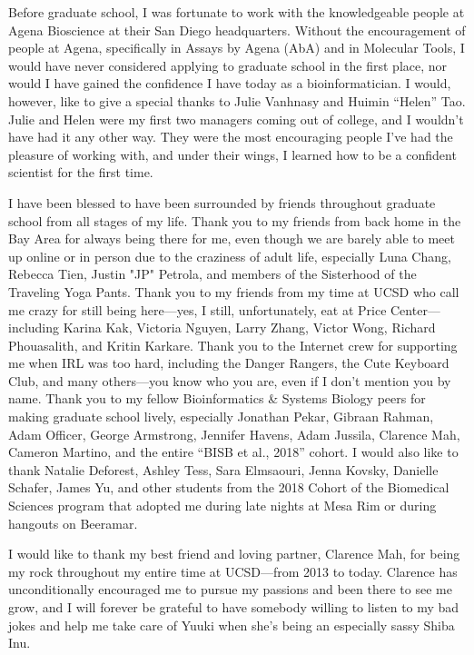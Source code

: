 \documentclass[11pt]{formatting-template}
\begin{document}
\begin{acknowledgements}
	Before graduate school, I was fortunate to work with the knowledgeable people at Agena Bioscience at their San Diego headquarters. Without the encouragement of people at Agena, specifically in Assays by Agena (AbA) and in Molecular Tools, I would have never considered applying to graduate school in the first place, nor would I have gained the confidence I have today as a bioinformatician. I would, however, like to give a special thanks to Julie Vanhnasy and Huimin “Helen” Tao. Julie and Helen were my first two managers coming out of college, and I wouldn’t have had it any other way. They were the most encouraging people I’ve had the pleasure of working with, and under their wings, I learned how to be a confident scientist for the first time.
	
	I have been blessed to have been surrounded by friends throughout graduate school from all stages of my life. Thank you to my friends from back home in the Bay Area for always being there for me, even though we are barely able to meet up online or in person due to the craziness of adult life, especially Luna Chang, Rebecca Tien, Justin "JP" Petrola, and members of the Sisterhood of the Traveling Yoga Pants. Thank you to my friends from my time at UCSD who call me crazy for still being here—yes, I still, unfortunately, eat at Price Center—including Karina Kak, Victoria Nguyen, Larry Zhang, Victor Wong, Richard Phouasalith, and Kritin Karkare. Thank you to the Internet crew for supporting me when IRL was too hard, including the Danger Rangers, the Cute Keyboard Club, and many others—you know who you are, even if I don’t mention you by name. Thank you to my fellow Bioinformatics \& Systems Biology peers for making graduate school lively, especially Jonathan Pekar, Gibraan Rahman, Adam Officer, George Armstrong, Jennifer Havens, Adam Jussila, Clarence Mah, Cameron Martino, and the entire “BISB et al., 2018” cohort. I would also like to thank Natalie Deforest, Ashley Tess, Sara Elmsaouri, Jenna Kovsky, Danielle Schafer, James Yu, and other students from the 2018 Cohort of the Biomedical Sciences program that adopted me during late nights at Mesa Rim or during hangouts on Beeramar. 
	
	I would like to thank my best friend and loving partner, Clarence Mah, for being my rock throughout my entire time at UCSD—from 2013 to today. Clarence has unconditionally encouraged me to pursue my passions and been there to see me grow, and I will forever be grateful to have somebody willing to listen to my bad jokes and help me take care of Yuuki when she’s being an especially sassy Shiba Inu. 
	

\end{acknowledgements}
\end{document}
